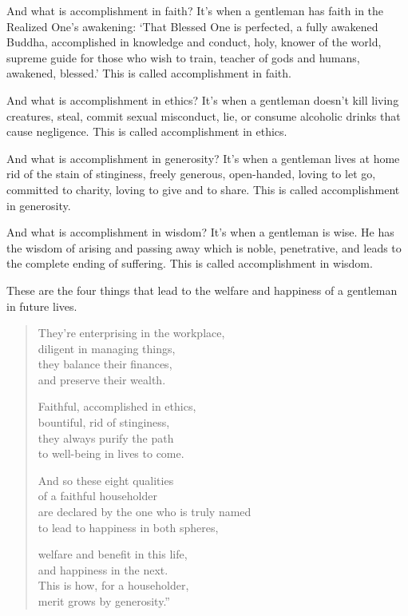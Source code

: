 \documentclass[12pt,openany]{book}%
\begin{document}
And what is accomplishment in faith? It’s when a gentleman has faith in the Realized One’s awakening: ‘That Blessed One is perfected, a fully awakened Buddha, accomplished in knowledge and conduct, holy, knower of the world, supreme guide for those who wish to train, teacher of gods and humans, awakened, blessed.’ This is called accomplishment in faith. 

And what is accomplishment in ethics? It’s when a gentleman doesn’t kill living creatures, steal, commit sexual misconduct, lie, or consume alcoholic drinks that cause negligence. This is called accomplishment in ethics. 

And what is accomplishment in generosity? It’s when a gentleman lives at home rid of the stain of stinginess, freely generous, open-handed, loving to let go, committed to charity, loving to give and to share. This is called accomplishment in generosity. 

And what is accomplishment in wisdom? It’s when a gentleman is wise. He has the wisdom of arising and passing away which is noble, penetrative, and leads to the complete ending of suffering. This is called accomplishment in wisdom. 

These are the four things that lead to the welfare and happiness of a gentleman in future lives. 

\begin{verse}%
They’re enterprising in the workplace, \\
diligent in managing things, \\
they balance their finances, \\
and preserve their wealth. 

Faithful, accomplished in ethics, \\
bountiful, rid of stinginess, \\
they always purify the path \\
to well-being in lives to come. 

And so these eight qualities \\
of a faithful householder \\
are declared by the one who is truly named \\
to lead to happiness in both spheres, 

welfare and benefit in this life, \\
and happiness in the next. \\
This is how, for a householder, \\
merit grows by generosity.” 

%
\end{verse}
\end{document}

